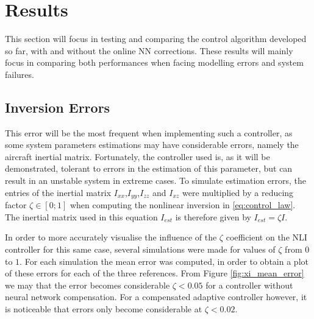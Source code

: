 
\section{Results}
\label{sec:resul}

This section will focus in testing and comparing the control algorithm developed so far, with and without the online NN corrections. These results will mainly focus in comparing both performances when facing modelling errors and system failures.


\subsection{Inversion Errors}

This error will be the most frequent when implementing such a controller, as some system parameters estimations may have considerable errors, namely the aircraft inertial matrix. Fortunately, the controller used is, as it will be demonstrated, tolerant to errors in the estimation of this parameter, but can result in an unstable system in extreme cases. To simulate estimation errors, the entries of the inertial matrix $I_{xx}$,$I_{yy}$,$I_{zz}$ and $I_{xz}$ were multiplied by a reducing factor $\zeta \in [0;1]$ when computing the nonlinear inversion in \ref{eq:control_law}. The inertial matrix used in this equation $I_{est}$ is therefore given by $I_{est} = \zeta I$.

In order to more accurately visualise the influence of the $\zeta$ coefficient on the NLI controller for this same case, several simulations were made for values of $\zeta$ from $0$ to $1$. For each simulation the mean error was computed, in order to obtain a plot of these errors for each of the three references. From Figure \ref{fig:xi_mean_error} we may that the error becomes considerable $\zeta<0.05$ for a controller without neural network compensation. For a compensated adaptive controller however, it is noticeable that errors only become considerable at $\zeta<0.02$.

